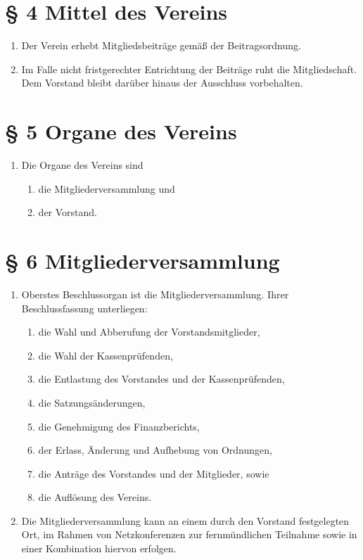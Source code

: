 \documentclass[11pt,a4paper]{scrartcl}
\begin{document}
\section*{§ 4 Mittel des Vereins}

\begin{enumerate}[label=\arabic*.]
    \item Der Verein erhebt Mitgliedsbeiträge gemäß der Beitragsordnung.
    \item Im Falle nicht fristgerechter Entrichtung der Beiträge ruht die Mitgliedschaft. Dem Vorstand bleibt darüber hinaus der Ausschluss vorbehalten.
\end{enumerate}

\section*{§ 5 Organe des Vereins}
\begin{enumerate}[label=\arabic*.]
    \item Die Organe des Vereins sind
    \begin{enumerate}[label=\roman*.]
        \item die Mitgliederversammlung und
        \item der Vorstand.
    \end{enumerate}
\end{enumerate}

\section*{§ 6 Mitgliederversammlung}
\begin{enumerate}[label=\arabic*.]
    \item Oberstes Beschlussorgan ist die Mitgliederversammlung. Ihrer Beschlussfassung unterliegen:
    \begin{enumerate}[label=\roman*.]
        \item die Wahl und Abberufung der Vorstandsmitglieder,
        \item die Wahl der Kassenprüfenden,
        \item die Entlastung des Vorstandes und der Kassenprüfenden,
        \item die Satzungsänderungen,
        \item die Genehmigung des Finanzberichts,
        \item der Erlass, Änderung und Aufhebung von Ordnungen,
        \item die Anträge des Vorstandes und der Mitglieder, sowie
        \item die Auflösung des Vereins.
    \end{enumerate}
    \item Die Mitgliederversammlung kann an einem durch den Vorstand festgelegten Ort, im Rahmen von Netzkonferenzen zur fernmündlichen Teilnahme sowie in einer Kombination hiervon erfolgen.
\end{enumerate}
\end{document}
